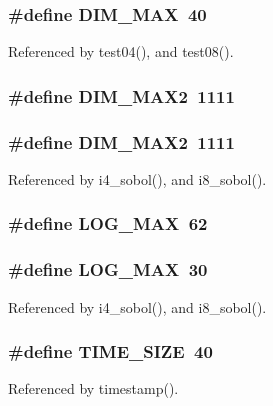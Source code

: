 \subsubsection{\setlength{\rightskip}{0pt plus 5cm}\#define DIM\_\-MAX~40}\label{sobol_8cpp_4bf6f11165a23227af11f1d0d75798a4}




Referenced by test04(), and test08().
\subsubsection{\setlength{\rightskip}{0pt plus 5cm}\#define DIM\_\-MAX2~1111}\label{sobol_8cpp_08477d6b4326959b1d01d9d5795cc8f3}


\subsubsection{\setlength{\rightskip}{0pt plus 5cm}\#define DIM\_\-MAX2~1111}\label{sobol_8cpp_08477d6b4326959b1d01d9d5795cc8f3}




Referenced by i4\_\-sobol(), and i8\_\-sobol().
\subsubsection{\setlength{\rightskip}{0pt plus 5cm}\#define LOG\_\-MAX~62}\label{sobol_8cpp_c964c67ea194ec22067081ea9fd4870f}


\subsubsection{\setlength{\rightskip}{0pt plus 5cm}\#define LOG\_\-MAX~30}\label{sobol_8cpp_c964c67ea194ec22067081ea9fd4870f}




Referenced by i4\_\-sobol(), and i8\_\-sobol().
\subsubsection{\setlength{\rightskip}{0pt plus 5cm}\#define TIME\_\-SIZE~40}\label{sobol_8cpp_c1c7bc76dbfd8378fc96541a6243afd1}




Referenced by timestamp().